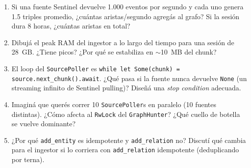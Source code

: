 \begin{ejercicios}
\begin{enumerate}
    \item \starred{} Si una fuente Sentinel devuelve 1.000 eventos
    por segundo y cada uno genera 1.5 triples promedio, ¿cuántas
    aristas/segundo agregás al grafo? Si la sesión dura 8 horas,
    ¿cuántas aristas en total?

    \item Dibujá el peak RAM del ingestor a lo largo del tiempo
    para una sesión de 28~GB. ¿Tiene picos? ¿Por qué se estabiliza
    en $\sim$10~MB del chunk?

    \item \starred{} El loop del \texttt{SourcePoller} es
    \texttt{while let Some(chunk) = source.next\_chunk().await}.
    ¿Qué pasa si la fuente nunca devuelve \texttt{None} (un
    streaming infinito de Sentinel pulling)? Diseñá una
    \emph{stop condition} adecuada.

    \item Imaginá que querés correr 10 \texttt{SourcePoller}s en
    paralelo (10 fuentes distintas). ¿Cómo afecta al
    \texttt{RwLock} del \texttt{GraphHunter}? ¿Qué cuello de
    botella se vuelve dominante?

    \item ¿Por qué \texttt{add\_entity} es idempotente y
    \texttt{add\_relation} no? Discutí qué cambia para el ingestor
    si lo corriera con \texttt{add\_relation} idempotente
    (deduplicando por terna).
\end{enumerate}
\end{ejercicios}
